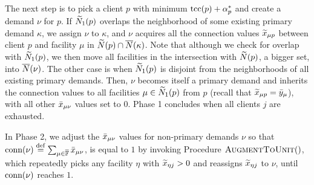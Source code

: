 \documentclass{llncs}
\begin{document}
The next step is to pick a client $p$ with minimum
$\textrm{tcc}(p)+\alpha_p^\ast$ and create a demand $\nu$ for $p$. If
${\widetilde N}_1(p)$ overlaps the neighborhood of some existing primary
demand $\kappa$, we assign $\nu$ to $\kappa$, and $\nu$ acquires all the
connection values ${\widetilde x}_{\mu p}$ between client $p$ and facility
$\mu$ in ${\widetilde N}(p)\cap {\overline{N}}(\kappa)$. Note that although we check
for overlap with ${\widetilde N}_1(p)$, we then move all facilities in the
intersection with ${\widetilde N}(p)$, a bigger set, into ${\overline{N}}(\nu)$.
The other case is when ${\widetilde N}_1(p)$ is disjoint from the
neighborhoods of all existing primary demands. Then, $\nu$ becomes
itself a primary demand and inherits the connection values to all
facilities $\mu\in{\widetilde N}_1(p)$ from $p$ (recall that ${\widetilde x}_{\mu
  p} = {\bar y}_{\mu}$), with all other ${\bar x}_{\mu\nu}$ values set to
$0$. Phase 1 concludes when all clients $j$ are exhausted.

In Phase 2, we adjust the ${\bar x}_{\mu\nu}$ values for non-primary
demands $\nu$ so that ${\textrm{conn}}(\nu) \stackrel{\mathrm{def}}{=}
\sum_{\mu\in\overline{\mathbb{F}}}{\bar x}_{\mu \nu}$, is equal to $1$ by invoking
Procedure ${\textsc{AugmentToUnit}}()$, which repeatedly picks any facility
$\eta$ with ${\widetilde x}_{\eta j} >0$ and reassigns ${\widetilde x}_{\eta j}$ to
$\nu$, until ${\textrm{conn}}(\nu)$ reaches $1$.

\end{document}
